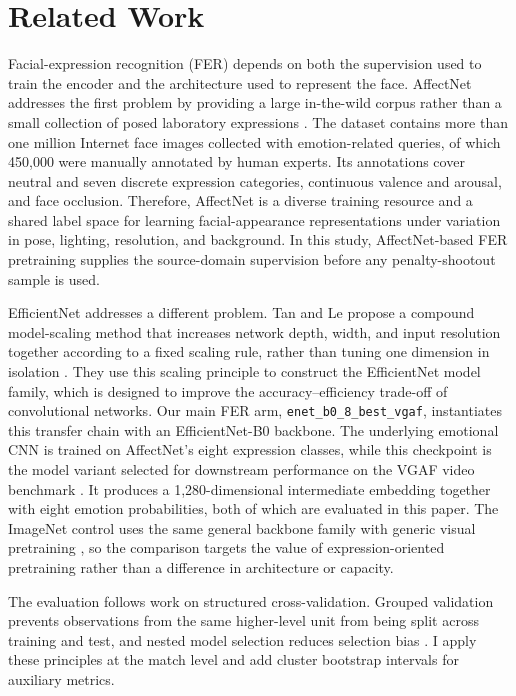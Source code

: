 \documentclass{article}
\begin{document}
\section{Related Work}

Facial-expression recognition (FER) depends on both the supervision used to train the encoder and the architecture used to represent the face. AffectNet addresses the first problem by providing a large in-the-wild corpus rather than a small collection of posed laboratory expressions \citep{mollahosseini2019}. The dataset contains more than one million Internet face images collected with emotion-related queries, of which 450,000 were manually annotated by human experts. Its annotations cover neutral and seven discrete expression categories, continuous valence and arousal, and face occlusion. Therefore, AffectNet is a diverse training resource and a shared label space for learning facial-appearance representations under variation in pose, lighting, resolution, and background. In this study, AffectNet-based FER pretraining supplies the source-domain supervision before any penalty-shootout sample is used.

EfficientNet addresses a different problem. Tan and Le propose a compound model-scaling method that increases network depth, width, and input resolution together according to a fixed scaling rule, rather than tuning one dimension in isolation \citep{tan2019}. They use this scaling principle to construct the EfficientNet model family, which is designed to improve the accuracy--efficiency trade-off of convolutional networks. Our main FER arm, \texttt{enet\_b0\_8\_best\_vgaf}, instantiates this transfer chain with an EfficientNet-B0 backbone. The underlying emotional CNN is trained on AffectNet's eight expression classes, while this checkpoint is the model variant selected for downstream performance on the VGAF video benchmark \citep{savchenko2022efficient,sharma2019vgaf}. It produces a 1,280-dimensional intermediate embedding together with eight emotion probabilities, both of which are evaluated in this paper. The ImageNet control uses the same general backbone family with generic visual pretraining \citep{deng2009}, so the comparison targets the value of expression-oriented pretraining rather than a difference in architecture or capacity.

The evaluation follows work on structured cross-validation. Grouped validation prevents observations from the same higher-level unit from being split across training and test, and nested model selection reduces selection bias \citep{roberts2017,varma2006}. I apply these principles at the match level and add cluster bootstrap intervals for auxiliary metrics.
\end{document}

